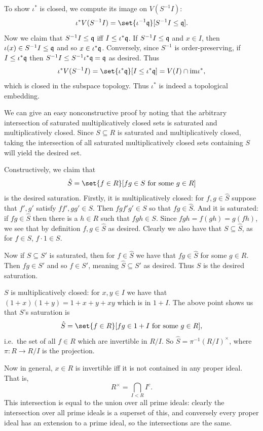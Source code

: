     To show $\iota^*$ is closed, we compute its image on $V(S^{-1}I)$:
    $$ \iota^*V(S^{-1}I) = \set{\iota^{-1}\q}[S^{-1}I\leq\q] . $$
    Now we claim that $S^{-1}I\leq{{\frak q}}$ iff $I\leq\iota^*{{\frak q}}$.
    If $S^{-1}I\leq{{\frak q}}$ and $x\in I$, then $\iota(x)\in S^{-1}I\leq{{\frak q}}$ and so $x\in\iota^*{{\frak q}}$.
    Conversely, since $S^{-1}$ is order-preserving, if $I\leq\iota^*{{\frak q}}$ then $S^{-1}I\leq S^{-1}\iota^*{{\frak q}}={{\frak q}}$ as desired.
    Thus
    $$ \iota^*V(S^{-1}I) = \set{\iota^*\q}[I\leq\iota^*\q] = V(I)\cap\im\iota^* , $$
    which is closed in the subspace topology.
    Thus $\iota^*$ is indeed a topological embedding.

    \item
    \benum
        \item We can give an easy nonconstructive proof by noting that the arbitrary intersection of saturated multiplicatively closed sets is
        saturated and multiplicatively closed.
        Since $S\subseteq R$ is saturated and multiplicatively closed, taking the intersection of all saturated multiplicatively closed sets containing
        $S$ will yield the desired set.

        Constructively, we claim that
        $$ \hat S = \set{f\in R}[\hbox{$fg\in S$ for some $g\in R$}] $$
        is the desired saturation.
        Firstly, it is multiplicatively closed: for $f,g\in\hat S$ suppose that $f',g'$ satisfy $ff',gg'\in S$.
        Then $fgf'g'\in S$ so that $fg\in\hat S$.
        And it is saturated: if $fg\in\hat S$ then there is a $h\in R$ such that $fgh\in S$.
        Since $fgh=f(gh)=g(fh)$, we see that by definition $f,g\in\hat S$ as desired.
        Clearly we also have that $S\subseteq\hat S$, as for $f\in S$, $f\cdot1\in S$.

        Now if $S\subseteq S'$ is saturated, then for $f\in\hat S$ we have that $fg\in\hat S$ for some $g\in R$.
        Then $fg\in S'$ and so $f\in S'$, meaning $\hat S\subseteq S'$ as desired.
        Thus $\hat S$ is the desired saturation.

        \item $S$ is multiplicatively closed: for $x,y\in I$ we have that $(1+x)(1+y)=1+x+y+xy$ which is in $1+I$.
        The above point shows us that $S$'s saturation is
        $$ \hat S = \set{f\in R}[\hbox{$fg\in 1+I$ for some $g\in R$}] , $$
        i.e.\ the set of all $f\in R$ which are invertible in $R/I$.
        So $\hat S=\pi^{-1}(R/I)^\times$, where $\pi\colon R\to R/I$ is the projection.

        Now in general, $x\in R$ is invertible iff it is not contained in any proper ideal.
        That is,
        $$ R^\times = \bigcap_{I<R}I^c . $$
        This intersection is equal to the union over all prime ideals: clearly the intersection over all prime ideals is a superset of this,
        and conversely every proper ideal has an extension to a prime ideal, so the intersections are the same.


